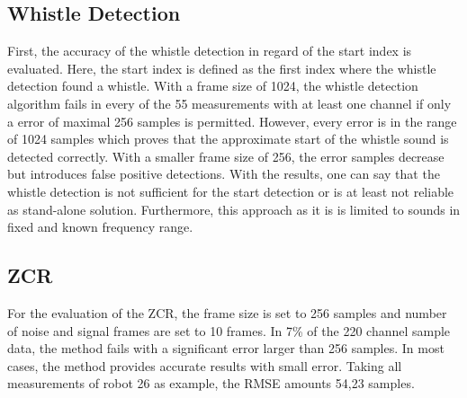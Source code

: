 \subsection{Whistle Detection}
\label{subsec:04_whistleDetection}

First, the accuracy of the whistle detection in regard of the start index
is evaluated.
Here, the start index is defined as the first index where the whistle detection
found a whistle.
With a frame size of 1024, the whistle detection algorithm fails in every of the
55 measurements with at least one channel if only a error of maximal 256 samples
is permitted.
However, every error is in the range of 1024 samples which proves that the
approximate start of the whistle sound is detected correctly.
With a smaller frame size of 256, the error samples decrease but introduces
false positive detections.
With the results, one can say that the whistle detection is not sufficient
for the start detection or is at least not reliable as stand-alone solution.
Furthermore, this approach as it is is limited to sounds in fixed and known frequency range.


\subsection{ZCR}
\label{subsec:04_zcr}

For the evaluation of the \ac{ZCR},
the frame size is set to 256 samples and number of noise and signal frames
are set to 10 frames.
In 7\si{\percent} of the 220 channel sample data, the method fails with a significant
error larger than 256 samples.
In most cases, the method provides accurate results with small error.
Taking all measurements of robot 26 as example, the \ac{RMSE} amounts
54,23 samples.

